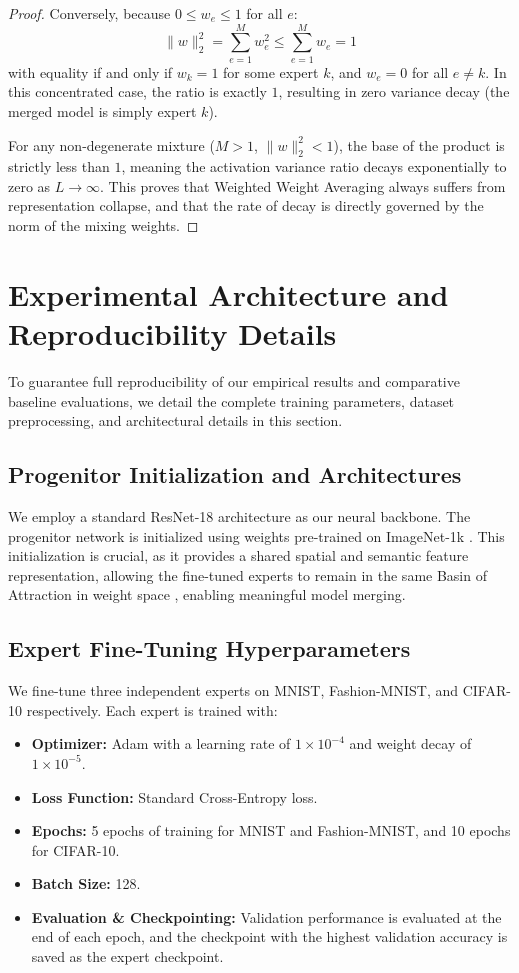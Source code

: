 \documentclass{article}
\theoremstyle{plain}
\theoremstyle{definition}
\theoremstyle{remark}
\begin{document}
\begin{proof}
Conversely, because $0 \le w_e \le 1$ for all $e$:
\begin{equation}
    \|w\|_2^2 = \sum_{e=1}^M w_e^2 \le \sum_{e=1}^M w_e = 1
\end{equation}
with equality if and only if $w_k = 1$ for some expert $k$, and $w_e = 0$ for all $e \neq k$. In this concentrated case, the ratio is exactly $1$, resulting in zero variance decay (the merged model is simply expert $k$).

For any non-degenerate mixture ($M > 1$, $\|w\|_2^2 < 1$), the base of the product is strictly less than $1$, meaning the activation variance ratio decays exponentially to zero as $L \to \infty$. This proves that Weighted Weight Averaging always suffers from representation collapse, and that the rate of decay is directly governed by the norm of the mixing weights.
\end{proof}

\section{Experimental Architecture and Reproducibility Details}
\label{appendix:reproducibility}
To guarantee full reproducibility of our empirical results and comparative baseline evaluations, we detail the complete training parameters, dataset preprocessing, and architectural details in this section.

\subsection{Progenitor Initialization and Architectures}
We employ a standard ResNet-18 architecture \cite{he2016deep} as our neural backbone. The progenitor network is initialized using weights pre-trained on ImageNet-1k \cite{deng2009imagenet}. This initialization is crucial, as it provides a shared spatial and semantic feature representation, allowing the fine-tuned experts to remain in the same Basin of Attraction in weight space \cite{ainsworth2023git}, enabling meaningful model merging.

\subsection{Expert Fine-Tuning Hyperparameters}
We fine-tune three independent experts on MNIST, Fashion-MNIST, and CIFAR-10 respectively. Each expert is trained with:
\begin{itemize}
    \item \textbf{Optimizer:} Adam with a learning rate of $1 \times 10^{-4}$ and weight decay of $1 \times 10^{-5}$.
    \item \textbf{Loss Function:} Standard Cross-Entropy loss.
    \item \textbf{Epochs:} 5 epochs of training for MNIST and Fashion-MNIST, and 10 epochs for CIFAR-10.
    \item \textbf{Batch Size:} 128.
    \item \textbf{Evaluation \& Checkpointing:} Validation performance is evaluated at the end of each epoch, and the checkpoint with the highest validation accuracy is saved as the expert checkpoint.
\end{itemize}
\end{document}

